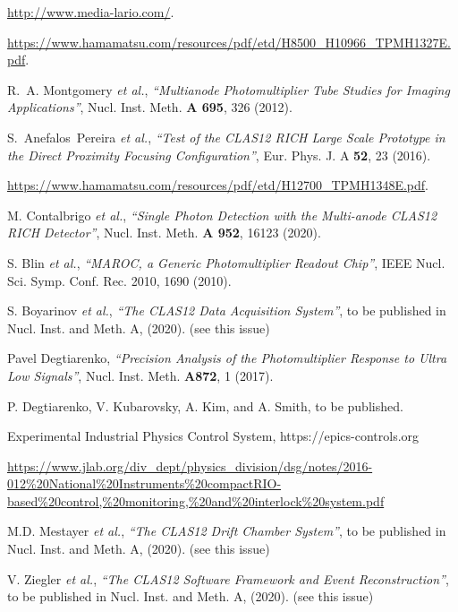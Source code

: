 \documentclass[5p,times,twocolumn]{elsarticle}
\begin{document}
\begin{thebibliography}{00}
 \url{http://www.media-lario.com/}.

 \url{https://www.hamamatsu.com/resources/pdf/etd/H8500\_H10966\_TPMH1327E.pdf}.
  
R.~A. Montgomery {\it et al.}, {\it ``Multianode Photomultiplier Tube Studies for Imaging Applications''},
Nucl. Inst. Meth. {\bf A 695}, 326 (2012).

S.~Anefalos~Pereira {\it et al.}, {\it ``Test of the CLAS12 RICH Large Scale Prototype in the Direct Proximity Focusing Configuration''},
Eur. Phys. J. A {\bf 52}, 23 (2016).

 \url{https://www.hamamatsu.com/resources/pdf/etd/H12700\_TPMH1348E.pdf}.

M. Contalbrigo {\it et al.}, {\it ``Single Photon Detection with the Multi-anode CLAS12 RICH Detector''}, 
Nucl. Inst. Meth. {\bf A 952}, 16123 (2020).

 S. Blin {\it et al.}, {\it ``MAROC, a Generic Photomultiplier Readout Chip''},
IEEE Nucl. Sci. Symp. Conf. Rec. 2010, 1690 (2010).

S. Boyarinov {\it et al.}, {\it ``The CLAS12 Data Acquisition System''}, 
to be published in Nucl. Inst. and Meth. A, (2020). (see this issue)

Pavel Degtiarenko, {\it ``Precision Analysis of the Photomultiplier Response to Ultra Low Signals''}, 
Nucl. Inst. Meth. {\bf A872}, 1 (2017).

 P. Degtiarenko, V. Kubarovsky, A. Kim, and A. Smith, to be published.

 Experimental Industrial Physics Control System, https://epics-controls.org

 \url{https://www.jlab.org/div_dept/physics_division/dsg/notes/2016-012%20National%20Instruments%20compactRIO-based%20control,%20monitoring,%20and%20interlock%20system.pdf}

M.D. Mestayer {\it et al.}, {\it ``The CLAS12 Drift Chamber System''}, to be published in Nucl. Inst.
and Meth. A, (2020). (see this issue)

V. Ziegler {\it et al.}, {\it ``The CLAS12 Software Framework and Event Reconstruction''}, to be published in Nucl. Inst.
and Meth. A, (2020). (see this issue)
  
\end{thebibliography}
\end{document}
